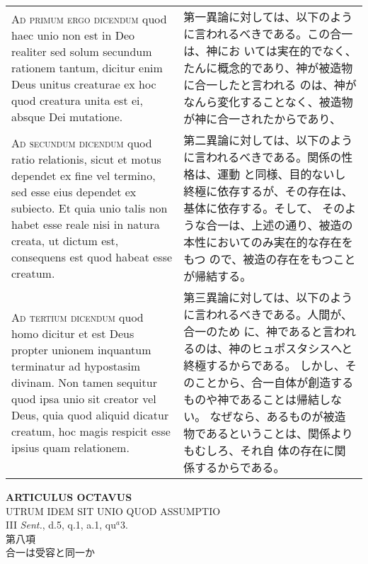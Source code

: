 \documentclass[10pt]{jsarticle} %
\begin{document}
\begin{longtable}{p{21em}p{21em}}
{\scshape Ad primum ergo dicendum} quod haec unio non est in Deo
realiter sed solum secundum rationem tantum, dicitur enim Deus unitus
creaturae ex hoc quod creatura unita est ei, absque Dei mutatione.


&


第一異論に対しては、以下のように言われるべきである。この合一は、神にお
いては実在的でなく、たんに概念的であり、神が被造物に合一したと言われる
のは、神がなんら変化することなく、被造物が神に合一されたからであり、

\\



{\scshape Ad secundum dicendum} quod ratio relationis, sicut et motus
dependet ex fine vel termino, sed esse eius dependet ex subiecto. Et
quia unio talis non habet esse reale nisi in natura creata, ut dictum
est, consequens est quod habeat esse creatum.


&

第二異論に対しては、以下のように言われるべきである。関係の性格は、運動
と同様、目的ないし終極に依存するが、その存在は、基体に依存する。そして、
そのような合一は、上述の通り、被造の本性においてのみ実在的な存在をもつ
ので、被造の存在をもつことが帰結する。

\\



{\scshape Ad tertium dicendum} quod homo dicitur et est Deus propter
unionem inquantum terminatur ad hypostasim divinam. Non tamen sequitur
quod ipsa unio sit creator vel Deus, quia quod aliquid dicatur
creatum, hoc magis respicit esse ipsius quam relationem.


&

第三異論に対しては、以下のように言われるべきである。人間が、合一のため
に、神であると言われるのは、神のヒュポスタシスへと終極するからである。
しかし、そのことから、合一自体が創造するものや神であることは帰結しない。
なぜなら、あるものが被造物であるということは、関係よりもむしろ、それ自
体の存在に関係するからである。

\\




\end{longtable}
\newpage






\begin{center}
{\Large {\bf ARTICULUS OCTAVUS}}\\ {\large UTRUM IDEM SIT UNIO QUOD
ASSUMPTIO}\\ {\footnotesize III {\itshape Sent.}, d.5, q.1, a.1,
qu$^a$3.}\\ {\Large 第八項\\合一は受容と同一か}
\end{center}
\end{document}
